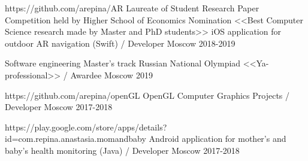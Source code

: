 


\vspace{0cm}\begin{cventries}

\cventry
{https://github.com/arepina/AR
	\newline Laureate of Student Research Paper Competition held by Higher School of Economics
	\newline Nomination <<Best Computer Science research made by Master and PhD students>>
} %
{iOS application for outdoor AR navigation  (Swift) / Developer} %
{Moscow} %
{2018-2019} %
{}

\cventry
{Software engineering Master's track} %
{Russian National Olympiad <<Ya-professional>> / Awardee} %
{Moscow} %
{2019} %
{}	
	

\cventry
{https://github.com/arepina/openGL} %
{OpenGL Computer Graphics Projects / Developer} %
{Moscow} %
{2017-2018} %
{}
		
	
\cventry
{https://play.google.com/store/apps/details?id=com.repina.anastasia.momandbaby} %
{Android application for mother's and baby's health monitoring (Java) / Developer} %
{Moscow} %
{2017-2018} %
{}
	




\end{cventries}
